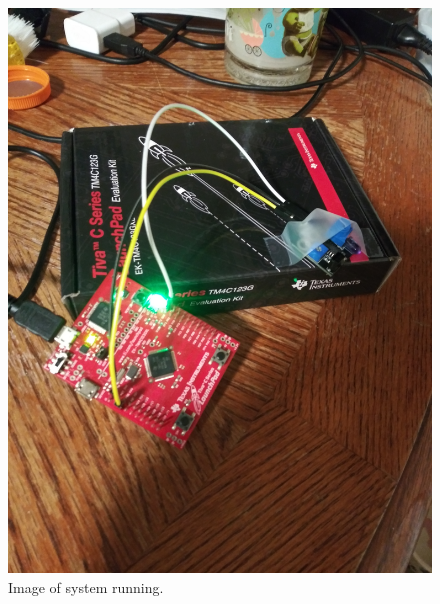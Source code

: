 \documentclass{article}
\begin{document}
\begin{itemize}
\begin{figure}[H]
    \includegraphics[width=\textwidth, angle=180]{Images/20201202_005731}
    \caption{Image of system running.}
    \label{image}
\end{figure}
\end{itemize}
\end{document}
